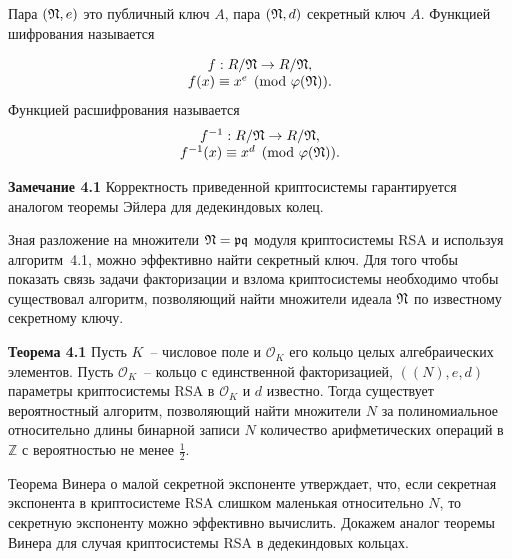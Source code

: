 \documentclass[_00_autoref.tex]{subfiles}
\begin{document}
    Пара $(\mathfrak{N}, e)$ это публичный ключ $A$, пара $(\mathfrak{N}, d)$ секретный ключ $A$.
    Функцией шифрования называется

    \begin{equation*}
        \begin{array}{c}
            f: R/\mathfrak{N} \to R/\mathfrak{N},\\
            f(x) \equiv x^{e} \pmod{\varphi(\mathfrak{N})}.
        \end{array}
    \end{equation*}
    Функцией расшифрования называется
    \begin{equation*}
        \begin{array}{c}
            f^{-1}: R/\mathfrak{N} \to R/\mathfrak{N},\\
            f^{-1}(x) \equiv x^{d}\pmod{\varphi(\mathfrak{N})}.
        \end{array}
    \end{equation*}

\textbf{Замечание 4.1}
    Корректность приведенной криптосистемы гарантируется аналогом теоремы Эйлера для дедекиндовых колец.


Зная разложение на множители $\mathfrak{N} = \mathfrak{p}\mathfrak{q}$ модуля криптосистемы RSA и используя алгоритм~4.1, можно эффективно найти секретный ключ.
Для того чтобы показать связь задачи факторизации и взлома криптосистемы необходимо чтобы существовал алгоритм, позволяющий найти множители идеала $\mathfrak{N}$ по известному секретному ключу.

\textbf{Теорема 4.1}\label{theorem:factor}
    Пусть $K$~-- числовое поле и $\mathcal{O}_K$ его кольцо целых алгебраических элементов.
    Пусть $\mathcal{O}_K$~-- кольцо с единственной факторизацией, $((N), e, d)$ параметры криптосистемы RSA в $\mathcal{O}_K$ и $d$ известно.
    Тогда существует вероятностный алгоритм, позволяющий найти множители $N$ за полиномиальное относительно длины бинарной записи $N$ количество арифметических операций в $\mathbb{Z}$ с вероятностью не менее $\frac{1}{2}$.

Теорема Винера о малой секретной экспоненте утверждает, что, если секретная экспонента в криптосистеме RSA слишком маленькая относительно $N$, то секретную экспоненту можно эффективно вычислить.
Докажем аналог теоремы Винера для случая криптосистемы RSA в дедекиндовых кольцах.
\end{document}

